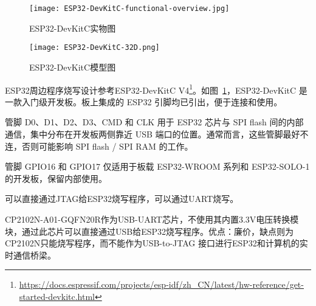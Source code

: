 
\begin{figure}[htbp]
    \centering
    \texttt{[image: ESP32-DevKitC-functional-overview.jpg]}
    \caption{ESP32-DevKitC实物图}
    \label{fig:ESP32-1}
\end{figure}


\begin{figure}[htbp]
    \centering
    \texttt{[image: ESP32-DevKitC-32D.png]}
    \caption{ESP32-DevKitC模型图}
    \label{fig:ESP32-2}
\end{figure}

ESP32周边程序烧写设计参考ESP32-DevKitC V4\footnote{\url{https://docs.espressif.com/projects/esp-idf/zh_CN/latest/hw-reference/get-started-devkitc.html}}。如图~\ref{fig:ESP32-1}，ESP32-DevKitC 是一款入门级开发板。板上集成的 ESP32 引脚均已引出，便于连接和使用。

管脚 D0、D1、D2、D3、CMD 和 CLK 用于 ESP32 芯片与 SPI flash 间的内部通信，集中分布在开发板两侧靠近 USB 端口的位置。通常而言，这些管脚最好不连，否则可能影响 SPI flash / SPI RAM 的工作。

管脚 GPIO16 和 GPIO17 仅适用于板载 ESP32-WROOM 系列和 ESP32-SOLO-1 的开发板，保留内部使用。

可以直接通过JTAG给ESP32烧写程序，可以通过UART烧写。

CP2102N-A01-GQFN20R作为USB-UART芯片，不使用其内置3.3V电压转换模块，通过此芯片可以直接通过USB给ESP32烧写程序。优点：廉价，缺点则为CP2102N只能烧写程序，而不能作为USB-to-JTAG 接口进行ESP32和计算机的实时通信桥梁。


